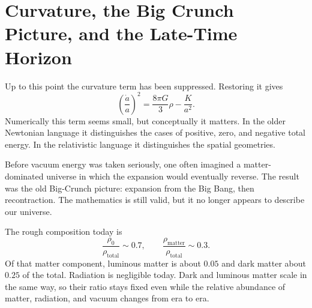 \begin{classroomqa}
\end{classroomqa}

\section{Curvature, the Big Crunch Picture, and the Late-Time Horizon}

Up to this point the curvature term has been suppressed. Restoring it gives
\begin{equation}
\left(\frac{\dot a}{a}\right)^2
=
\frac{8\pi G}{3}\rho
-
\frac{K}{a^2}.
\end{equation}
Numerically this term seems small, but conceptually it matters. In the older Newtonian language it distinguishes the cases of positive, zero, and negative total energy. In the relativistic language it distinguishes the spatial geometries.

Before vacuum energy was taken seriously, one often imagined a matter-dominated universe in which the expansion would eventually reverse. The result was the old Big-Crunch picture: expansion from the Big Bang, then recontraction. The mathematics is still valid, but it no longer appears to describe our universe.

\begin{classroomqa}
\end{classroomqa}

The rough composition today is
\begin{equation}
\frac{\rho_0}{\rho_{\text{total}}}\sim 0.7,
\qquad
\frac{\rho_{\text{matter}}}{\rho_{\text{total}}}\sim 0.3.
\end{equation}
Of that matter component, luminous matter is about \(0.05\) and dark matter about \(0.25\) of the total. Radiation is negligible today. Dark and luminous matter scale in the same way, so their ratio stays fixed even while the relative abundance of matter, radiation, and vacuum changes from era to era.


